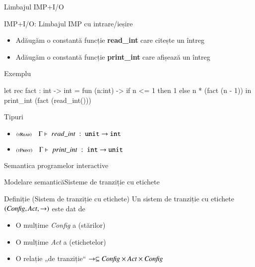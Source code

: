 \documentclass[xcolor=pdftex,romanian,colorlinks]{beamer}
\begin{document}
\begin{section}{Limbajul IMP+I/O}
\begin{frame}[fragile]{IMP+I/O: Limbajul IMP cu intrare/ieșire}
\begin{itemize}
\item Adăugăm o constantă funcție {\bf read\_int} care citește un întreg
\item Adăugăm o constantă funcție {\bf print\_int} care afișează un întreg
\end{itemize}


\vfill\begin{block}{Exemplu}
\vspace{-3ex}\hfill\begin{minipage}{.8\columnwidth}
\begin{asciiml}
let rec fact : int -> int = 
  fun (n:int) -> if n <= 1 then 1 else n * (fact (n - 1))
in print_int (fact (read_int()))
\end{asciiml}
\end{minipage}
\end{block}

\begin{block}{Tipuri}
\begin{itemize}
\item[] $\reg[tRead]{\tjud{read\_int}{{\Sunit} \rightarrow {\Sint}}{}}{}{}$
\item[] $\reg[tPrint]{\tjud{print\_int}{{\Sint} \rightarrow {\Sunit}}{}}{}{}$
\end{itemize}
\end{block}
\end{frame}

\begin{subsection}{Semantica programelor interactive}
\begin{frame}{Modelare semantică}{Sisteme de tranziție cu etichete}
\begin{block}{Definiție (Sistem de tranziție cu etichete)}
Un sistem de tranziție cu etichete $({\it Config}, {\it Act}, \rightarrow)$ este dat de 
\begin{itemize}
\item O mulțime {\it Config} a  (stărilor)
\item O mulțime {\it Act}  a  (etichetelor)
\item O relație „de tranziție“ $\rightarrow \subseteq {\it Config} \times {\it Act} \times {\it Config}$
\end{itemize}
\end{block}
\end{frame}


\end{subsection}
\end{section}
\end{document}
